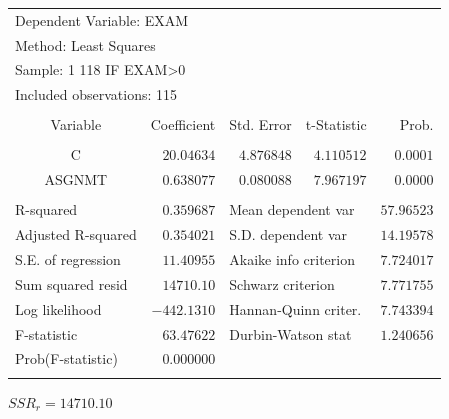 \documentclass[12pt]{report}
\begin{document}
\justify
\begin{table}[H]
	\centering
	\begin{tabular}{lrrrr}
		\multicolumn{3}{l}{Dependent Variable: EXAM}&\multicolumn{1}{c}{}&\multicolumn{1}{c}{}\\
		\multicolumn{3}{l}{Method: Least Squares}&\multicolumn{1}{c}{}&\multicolumn{1}{c}{}\\
		\multicolumn{3}{l}{Sample: 1 118 IF EXAM\textgreater 0}&\multicolumn{1}{c}{}&\multicolumn{1}{c}{}\\
		\multicolumn{3}{l}{Included observations: 115}&\multicolumn{1}{c}{}&\multicolumn{1}{c}{}\\
		[4.5pt] \hline \\ [-4.5pt]
		\multicolumn{1}{c}{Variable}&\multicolumn{1}{r}{Coefficient}&\multicolumn{1}{r}{Std. Error}&\multicolumn{1}{r}{t-Statistic}&\multicolumn{1}{r}{Prob.}\\
		[4.5pt] \hline \\ [-4.5pt]
		\multicolumn{1}{c}{C}&\multicolumn{1}{r}{$20.04634$}&\multicolumn{1}{r}{$4.876848$}&\multicolumn{1}{r}{$4.110512$}&\multicolumn{1}{r}{$0.0001$}\\
		\multicolumn{1}{c}{ASGNMT}&\multicolumn{1}{r}{$0.638077$}&\multicolumn{1}{r}{$0.080088$}&\multicolumn{1}{r}{$7.967197$}&\multicolumn{1}{r}{$0.0000$}\\
		[4.5pt] \hline \\ [-4.5pt]
		\multicolumn{1}{l}{R-squared}&\multicolumn{1}{r}{$0.359687$}&\multicolumn{2}{l}{Mean dependent var}&\multicolumn{1}{r}{$57.96523$}\\
		\multicolumn{1}{l}{Adjusted R-squared}&\multicolumn{1}{r}{$0.354021$}&\multicolumn{2}{l}{S.D. dependent var}&\multicolumn{1}{r}{$14.19578$}\\
		\multicolumn{1}{l}{S.E. of regression}&\multicolumn{1}{r}{$11.40955$}&\multicolumn{2}{l}{Akaike info criterion}&\multicolumn{1}{r}{$7.724017$}\\
		\multicolumn{1}{l}{Sum squared resid}&\multicolumn{1}{r}{$14710.10$}&\multicolumn{2}{l}{Schwarz criterion}&\multicolumn{1}{r}{$7.771755$}\\
		\multicolumn{1}{l}{Log likelihood}&\multicolumn{1}{r}{$-442.1310$}&\multicolumn{2}{l}{Hannan-Quinn criter.}&\multicolumn{1}{r}{$7.743394$}\\
		\multicolumn{1}{l}{F-statistic}&\multicolumn{1}{r}{$63.47622$}&\multicolumn{2}{l}{Durbin-Watson stat}&\multicolumn{1}{r}{$1.240656$}\\
		\multicolumn{1}{l}{Prob(F-statistic)}&\multicolumn{1}{r}{$0.000000$}&\multicolumn{1}{c}{}&\multicolumn{1}{c}{}&\multicolumn{1}{c}{}\\
		[4.5pt] \hline \\ [-4.5pt]
	\end{tabular}
\end{table}\centering $SSR_{r} = 14710.10$
\end{document}
